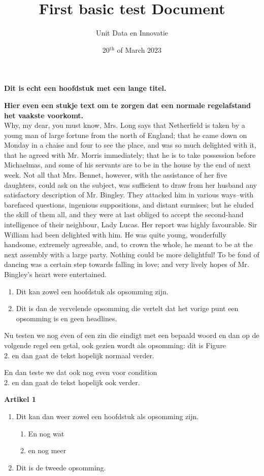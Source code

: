 \documentclass[10pt,a4paper]{report}
\title{First basic test Document}
\author{Unit Data en Innovatie}
\date{20${^{\textrm{th}}}$ of March 2023}
\begin{document}
 

\par
\Huge
\textbf{Dit is echt een hoofdstuk met een lange titel.}
\normalsize

\par
\textbf{Hier even een stukje text om te zorgen dat een normale regelafstand het vaakste voorkomt.} \\
Why, my dear, you must know, Mrs. Long says that Netherfield is taken by a young man of large fortune from the north of England; that he came down on Monday in a chaise and four to see the place, and was so much delighted with it, that he agreed with Mr. Morris immediately; that he is to take possession before Michaelmas, and some of his servants are to be in the house by the end of next week. Not all that Mrs. Bennet, however, with the assistance of her five daughters, could ask on the subject, was sufficient to draw from her husband any satisfactory description of Mr. Bingley. They attacked him in various ways--with barefaced questions, ingenious suppositions, and distant surmises; but he eluded the skill of them all, and they were at last obliged to accept the second-hand intelligence of their neighbour, Lady Lucas. Her report was highly favourable. Sir William had been delighted with him. He was quite young, wonderfully handsome, extremely agreeable, and, to crown the whole, he meant to be at the next assembly with a large party. Nothing could be more delightful! To be fond of dancing was a certain step towards falling in love; and very lively hopes of Mr. Bingley's heart were entertained.

\par
\begin{enumerate}
 \item Dit kan zowel een hoofdstuk als opsomming zijn.
 \item Dit is dan de vervelende opsomming die vertelt dat het vorige punt een opsomming is en geen headlines.
\end{enumerate}

\par
Nu testen we nog even of een zin die eindigt met een bepaald woord en dan op de volgende regel een getal, ook gezien wordt als opsomming: dit is Figure \\ 
2. en dan gaat de tekst hopelijk normaal verder.

\par
En dan teste we dat ook nog even voor condition \\ 
2. en dan gaat de tekst hopelijk ook verder.

\Huge
\textbf{Artikel 1}
\normalsize 

\begin{enumerate}
\item Dit kan dan weer zowel een hoofdstuk als opsomming zijn.
\begin{enumerate}
\item En nog wat
\item en nog meer
\end{enumerate}
\item Dit is de tweede opsomming.
\end{enumerate}
\end{document}
